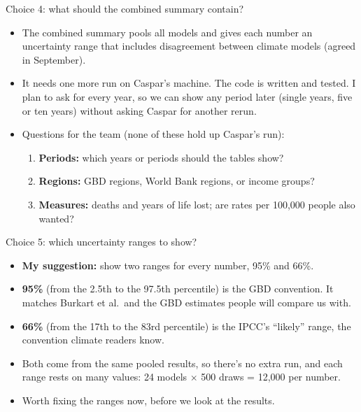 \documentclass[aspectratio=169,11pt]{beamer}
\begin{document}
\begin{frame}{Choice 4: what should the combined summary contain?}
  \begin{itemize}
    \item The combined summary pools all models and gives each number an
      uncertainty range that includes disagreement between climate models
      (agreed in September).
    \item It needs one more run on Caspar's machine. The code is written and
      tested. I plan to ask for every year, so we can show any period later
      (single years, five or ten years) without asking Caspar for another rerun.
    \item Questions for the team (none of these hold up Caspar's run):
      \begin{enumerate}
        \item \textbf{Periods:} which years or periods should the tables show?
        \item \textbf{Regions:} GBD regions, World Bank regions, or income
          groups?
        \item \textbf{Measures:} deaths and years of life lost; are rates per
          100,000 people also wanted?
      \end{enumerate}
  \end{itemize}
\end{frame}

\begin{frame}{Choice 5: which uncertainty ranges to show?}
  \begin{itemize}
    \item \textbf{My suggestion:} show two ranges for every number, 95\% and
      66\%.
    \item \textbf{95\%} (from the 2.5th to the 97.5th percentile) is the GBD
      convention. It matches Burkart et al.\ and the GBD estimates people
      will compare us with.
    \item \textbf{66\%} (from the 17th to the 83rd percentile) is the IPCC's
      ``likely'' range, the convention climate readers know.
    \item Both come from the same pooled results, so there's no extra run,
      and each range rests on many values: 24 models $\times$ 500 draws =
      12,000 per number.
    \item Worth fixing the ranges now, before we look at the results.
  \end{itemize}
\end{frame}
\end{document}
